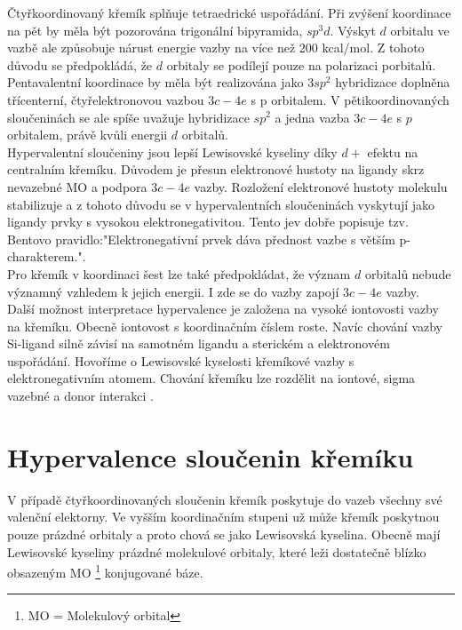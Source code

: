 \documentclass[
  digital, %
  table,   %
  lof,     %
  lot,     %
  oneside,
]{fithesis3}
\begin{document}
Čtyřkoordinovaný křemík splňuje tetraedrické uspořádání. Při zvýšení koordinace na pět by měla být pozorována trigonální bipyramida, $sp^3d$. Výskyt $d$ orbitalu ve vazbě ale způsobuje nárust energie vazby na více než 200 kcal/mol. Z tohoto důvodu se předpokládá, že $d$ orbitaly se podílejí pouze na polarizaci porbitalů. Pentavalentní koordinace by měla být realizována jako $3sp^2$ hybridizace doplněna třícenterní, čtyřelektronovou vazbou $3c-4e$ s p orbitalem. V pětikoordinovaných sloučeninách se ale spíše uvažuje hybridizace $sp^2$ a jedna vazba $3c-4e$ s $p$ orbitalem, právě kvůli energii $d$ orbitalů.\\
Hypervalentní sloučeniny jsou lepší Lewisovské kyseliny díky $d+$ efektu na centralním křemíku. Důvodem je přesun elektronové hustoty na ligandy skrz nevazebné MO a podpora $3c-4e$ vazby. Rozložení elektronové hustoty molekulu stabilizuje a z tohoto důvodu se v hypervalentních sloučeninách vyskytují jako ligandy prvky s vysokou elektronegativitou. Tento jev dobře popisuje tzv. Bentovo pravidlo:"Elektronegativní prvek dáva přednost vazbe s větším p-charakterem."\cite{hypervalentsiliconmacmillangroup2005}.\\
Pro křemík v koordinaci šest lze také předpokládat, že význam $d$ orbitalů nebude významný vzhledem k jejich energii. I zde se do vazby zapojí $3c-4e$ vazby\cite{Wagler2014}.\\
Další možnost interpretace hypervalence je založena na vysoké iontovosti vazby na křemíku. Obecně iontovost s koordinačním číslem roste.
Navíc chování vazby Si-ligand silně závisí na samotném ligandu a sterickém a elektronovém uspořádání. Hovoříme o Lewisovské kyselosti křemíkové vazby s elektronegativním atomem. Chování křemíku lze rozdělit na iontové, sigma vazebné a donor interakci \cite{Wagler2014}.\\


\section{Hypervalence sloučenin křemíku}\label{teorie_hypervalence}
V případě čtyřkoordinovaných sloučenin křemík poskytuje do vazeb všechny své valenční elektorny. Ve vyšším koordinačním stupeni už může křemík poskytnou pouze prázdné orbitaly a proto chová se jako Lewisovská kyselina. Obecně mají Lewisovské kyseliny prázdné molekulové orbitaly, které leži dostatečně blízko obsazeným MO \footnote{MO = Molekulový orbital} konjugované báze.
\end{document}
